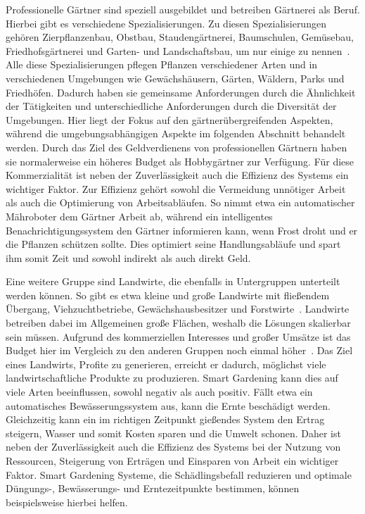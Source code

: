 \pagebreak

Professionelle Gärtner sind speziell ausgebildet und betreiben Gärtnerei als Beruf.
Hierbei gibt es verschiedene Spezialisierungen.
Zu diesen Spezialisierungen gehören Zierpflanzenbau, Obstbau, Staudengärtnerei, Baumschulen, Gemüsebau, Friedhofsgärtnerei und Garten- und Landschaftsbau, um nur einige zu nennen~\cite{Gaertnerarten}.
Alle diese Spezialisierungen pflegen Pflanzen verschiedener Arten und in verschiedenen Umgebungen wie Gewächshäusern, Gärten, Wäldern, Parks und Friedhöfen. 
Dadurch haben sie gemeinsame Anforderungen durch die Ähnlichkeit der Tätigkeiten und unterschiedliche Anforderungen durch die Diversität der Umgebungen.
Hier liegt der Fokus auf den gärtnerübergreifenden Aspekten, während die umgebungsabhängigen Aspekte im folgenden Abschnitt behandelt werden.
Durch das Ziel des Geldverdienens von professionellen Gärtnern haben sie normalerweise ein höheres Budget als Hobbygärtner zur Verfügung.
Für diese Kommerzialität ist neben der Zuverlässigkeit auch die Effizienz des Systems ein wichtiger Faktor.
Zur Effizienz gehört sowohl die Vermeidung unnötiger Arbeit als auch die Optimierung von Arbeitsabläufen.
So nimmt etwa ein automatischer Mähroboter dem Gärtner Arbeit ab, während ein intelligentes Benachrichtigungssystem den Gärtner informieren kann, wenn Frost droht und er die Pflanzen schützen sollte.
Dies optimiert seine Handlungsabläufe und spart ihm somit Zeit und sowohl indirekt als auch direkt Geld.

Eine weitere Gruppe sind Landwirte, die ebenfalls in Untergruppen unterteilt werden können.
So gibt es etwa kleine und große Landwirte mit fließendem Übergang, Viehzuchtbetriebe, Gewächshausbesitzer und Forstwirte~\cite{AgrarbetriebDefinition}.
Landwirte betreiben dabei im Allgemeinen große Flächen, weshalb die Lösungen skalierbar sein müssen.
Aufgrund des kommerziellen Interesses und großer Umsätze ist das Budget hier im Vergleich zu den anderen Gruppen noch einmal höher~\cite{UmsatzLandwirtschaft}.
Das Ziel eines Landwirts, Profite zu generieren, erreicht er dadurch, möglichst viele landwirtschaftliche Produkte zu produzieren.
Smart Gardening kann dies auf viele Arten beeinflussen, sowohl negativ als auch positiv.
Fällt etwa ein automatisches Bewässerungssystem aus, kann die Ernte beschädigt werden.
Gleichzeitig kann ein im richtigen Zeitpunkt gießendes System den Ertrag steigern, Wasser und somit Kosten sparen und die Umwelt schonen.
Daher ist neben der Zuverlässigkeit auch die Effizienz des Systems bei der Nutzung von Ressourcen, Steigerung von Erträgen und Einsparen von Arbeit ein wichtiger Faktor.
Smart Gardening Systeme, die Schädlingsbefall reduzieren und optimale Düngungs-, Bewässerungs- und Erntezeitpunkte bestimmen, können beispielsweise hierbei helfen.

